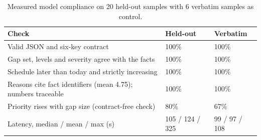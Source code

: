 \documentclass[conference]{IEEEtran}
\begin{document}
\begin{table}[t]
\caption{Measured model compliance on 20 held-out samples with 6 verbatim samples as control.}
\centering
\footnotesize
\begin{tabular}{@{}p{}p{}p{}@{}}
\hline
\textbf{Check} & \textbf{Held-out} & \textbf{Verbatim} \\ \hline
Valid JSON and six-key contract & 100\% & 100\% \\
Gap set, levels and severity agree with the facts & 100\% & 100\% \\
Schedule later than today and strictly increasing & 100\% & 100\% \\
Reasons cite fact identifiers (mean 4.75); numbers traceable & 100\% & 100\% \\
Priority rises with gap size (contract-free check) & 80\% & 67\% \\
Latency, median / mean / max (s) & 105 / 124 / 325 & 99 / 97 / 108 \\
\hline
\end{tabular}
\end{table}


\end{document}
